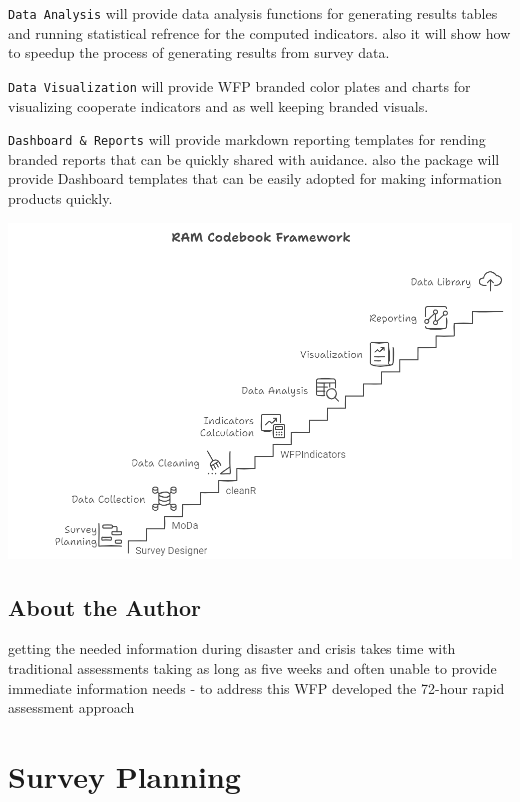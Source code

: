 \documentclass[
  letterpaper,
  DIV=11,
  numbers=noendperiod]{scrreprt}
\begin{document}
\texttt{Data\ Analysis} will provide data analysis functions for
generating results tables and running statistical refrence for the
computed indicators. also it will show how to speedup the process of
generating results from survey data.

\texttt{Data\ Visualization} will provide WFP branded color plates and
charts for visualizing cooperate indicators and as well keeping branded
visuals.

\texttt{Dashboard\ \&\ Reports} will provide markdown reporting
templates for rending branded reports that can be quickly shared with
auidance. also the package will provide Dashboard templates that can be
easily adopted for making information products quickly.

\includegraphics[width=1\linewidth,height=\textheight,keepaspectratio]{assets/Framework.png}

\section*{About the Author}\label{about-the-author}


getting the needed information during disaster and crisis takes time
with traditional assessments taking as long as five weeks and often
unable to provide immediate information needs - to address this WFP
developed the 72-hour rapid assessment approach


\chapter{Survey Planning}\label{survey-planning}
\end{document}
